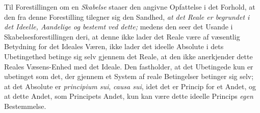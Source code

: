 Til Forestillingen om en \emph{Skabelse} staaer den angivne Opfattelse i det
Forhold, at den fra denne Forestilling tilegner sig den Sandhed, \emph{at det
Reale er begrundet i det Ideelle, Aandelige og bestemt ved dette;} medens den
seer det Usande i Skabelsesforestillingen deri, at denne ikke lader det Reale
være af væsentlig Betydning for det Ideales Væren, ikke lader det ideelle
Absolute i dets Ubetingethed betinge sig selv gjennem det Reale, at den ikke
anerkjender dette Reales Væsens-Enhed med det Ideale. Den fastholder, at det
Ubetingede kun er ubetinget som det, der gjennem et System af reale
Betingelser betinger sig selv; at det Absolute er \textit{principium sui},
\textit{causa sui}, idet det er Princip for et Andet, og at dette Andet, som
Principets Andet, kun kan være dette ideelle Princips \emph{egen} Bestemmelse.

